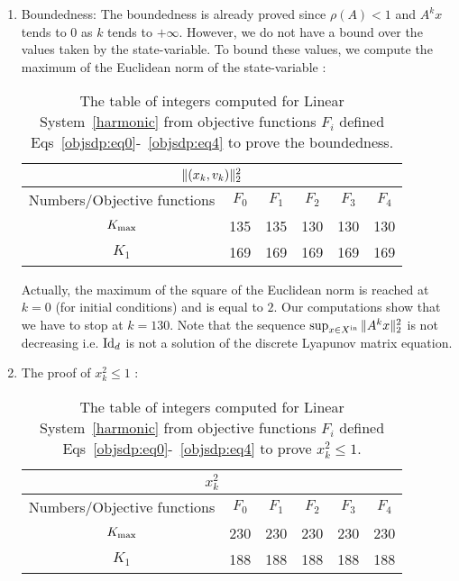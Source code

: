 \documentclass[10pt]{article}
\begin{document}
\begin{enumerate}
\item Boundedness: The boundedness is already proved since $\rho(A)<1$ and $A^k x$ tends to 0 as $k$ tends to $+\infty$. However, we do not have a bound over the values taken by the state-variable. To bound these values, we compute the maximum of the Euclidean norm of the state-variable :   

\begin{table}[h!]
\begin{center}
\begin{tabular}{|c|c|c|c|c|c|}
\hline
\multicolumn{6}{|c|}{$\| (x_k,v_k)\|_2^2$}\\
\hline
Numbers/Objective functions & $F_0$ & $F_{1}$ & $F_{2}$ & $F_3$ & $F_4$ \\
\hline
$K_{\rm max}$ &135 &135 &130 &130 &130 \\
\hline
 $K_{1}$ & 169& 169&169 &169 & 169\\
\hline
\end{tabular}
\end{center}
\caption{The table of integers computed for Linear System~\eqref{harmonic} from objective functions $F_i$ defined Eqs~\eqref{objsdp:eq0}-~\eqref{objsdp:eq4} to prove the boundedness.}
\end{table}

Actually, the maximum of the square of the Euclidean norm is reached at $k=0$ (for initial conditions) and is equal to $2$. Our computations show that we have to stop at $k=130$. Note that the sequence $\sup_{x\in X^\mathrm{in}} \| A^k x\|_2^2$ is not decreasing i.e. $\operatorname{Id}_d$ is not a solution of the discrete Lyapunov matrix equation. 
 
\item The proof of $x_{k}^2\leq 1$ : 
\begin{table}[h!]
\begin{center}
\begin{tabular}{|c|c|c|c|c|c|}
\hline
\multicolumn{6}{|c|}{$x_k^2$}\\
\hline
Numbers/Objective functions & $F_0$ & $F_{1}$ & $F_{2}$ & $F_3$ & $F_4$ \\
\hline
$K_{\rm max}$ &230 &230 & 230&230 &230 \\
\hline
 $K_{1}$ &188 &188 &188 &188 &188 \\
\hline
\end{tabular}
\end{center}
\caption{The table of integers computed for Linear System~\eqref{harmonic} from objective functions $F_i$ defined Eqs~\eqref{objsdp:eq0}-~\eqref{objsdp:eq4} to prove $x_k^2\leq 1$.}
\end{table}


\end{enumerate}
\end{document}
